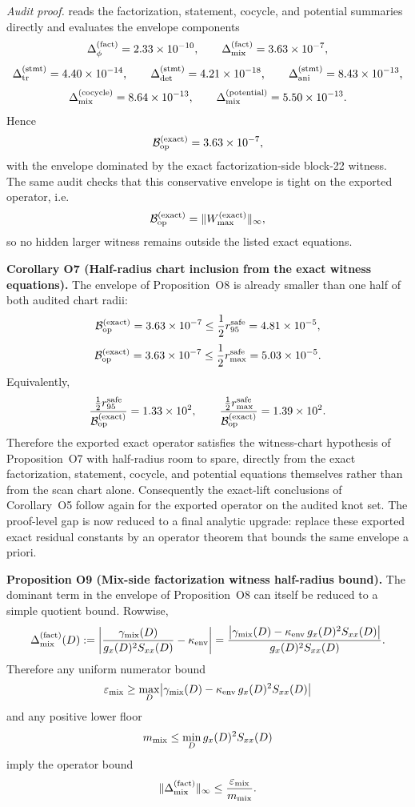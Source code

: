 \documentclass[aps,prd,onecolumn,notitlepage,nofootinbib,superscriptaddress,11pt,floatfix]{revtex4-2}
\begin{document}
\textit{Audit proof.}  reads the factorization, statement, cocycle, and potential summaries directly and evaluates the envelope components
\[
\Delta_{\phi}^{\rm(fact)}=2.33\times10^{-10},
\qquad
\Delta_{\rm mix}^{\rm(fact)}=3.63\times10^{-7},
\]
\[
\Delta_{\rm tr}^{\rm(stmt)}=4.40\times10^{-14},
\qquad
\Delta_{\rm det}^{\rm(stmt)}=4.21\times10^{-18},
\qquad
\Delta_{\rm ani}^{\rm(stmt)}=8.43\times10^{-13},
\]
\[
\Delta_{\rm mix}^{\rm(cocycle)}=8.64\times10^{-13},
\qquad
\Delta_{\rm mix}^{\rm(potential)}=5.50\times10^{-13}.
\]
Hence
\[
\mathcal B_{\rm op}^{\rm(exact)}=3.63\times10^{-7},
\]
with the envelope dominated by the exact factorization-side block-22 witness. The same audit checks that this conservative envelope is tight on the exported operator, i.e.
\[
\mathcal B_{\rm op}^{\rm(exact)}=\|W_{\max}^{\rm(exact)}\|_\infty,
\]
so no hidden larger witness remains outside the listed exact equations.

\medskip\noindent\textbf{Corollary O7 (Half-radius chart inclusion from the exact witness equations).}
The envelope of Proposition~O8 is already smaller than one half of both audited chart radii:
\[
\mathcal B_{\rm op}^{\rm(exact)}
=3.63\times10^{-7}
\le \frac{1}{2}r_{95}^{\rm safe}=4.81\times10^{-5},
\]
\[
\mathcal B_{\rm op}^{\rm(exact)}
=3.63\times10^{-7}
\le \frac{1}{2}r_{\max}^{\rm safe}=5.03\times10^{-5}.
\]
Equivalently,
\[
\frac{\tfrac12 r_{95}^{\rm safe}}{\mathcal B_{\rm op}^{\rm(exact)}}=1.33\times10^{2},
\qquad
\frac{\tfrac12 r_{\max}^{\rm safe}}{\mathcal B_{\rm op}^{\rm(exact)}}=1.39\times10^{2}.
\]
Therefore the exported exact operator satisfies the witness-chart hypothesis of Proposition~O7 with half-radius room to spare, directly from the exact factorization, statement, cocycle, and potential equations themselves rather than from the scan chart alone. Consequently the exact-lift conclusions of Corollary~O5 follow again for the exported operator on the audited knot set. The proof-level gap is now reduced to a final analytic upgrade: replace these exported exact residual constants by an operator theorem that bounds the same envelope a priori.

\medskip\noindent\textbf{Proposition O9 (Mix-side factorization witness half-radius bound).}
The dominant term in the envelope of Proposition~O8 can itself be reduced to a simple quotient bound. Rowwise,
\[
\Delta_{\rm mix}^{\rm(fact)}(D)
:=
\left|\frac{\gamma_{\rm mix}(D)}{g_x(D)^2 S_{xx}(D)}-\kappa_{\rm env}\right|
=
\frac{\bigl|\gamma_{\rm mix}(D)-\kappa_{\rm env}\,g_x(D)^2 S_{xx}(D)\bigr|}
{g_x(D)^2 S_{xx}(D)}.
\]
Therefore any uniform numerator bound
\[
\varepsilon_{\rm mix}
\ge
\max_D \bigl|\gamma_{\rm mix}(D)-\kappa_{\rm env}\,g_x(D)^2 S_{xx}(D)\bigr|
\]
and any positive lower floor
\[
m_{\rm mix}\le \min_D g_x(D)^2 S_{xx}(D)
\]
imply the operator bound
\[
\|\Delta_{\rm mix}^{\rm(fact)}\|_\infty
\le \frac{\varepsilon_{\rm mix}}{m_{\rm mix}}.
\]
\end{document}
